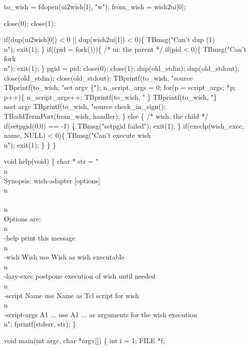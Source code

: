   to_wish = fdopen(ui2wish[1], "w");
  from_wish = wish2ui[0];

  close(0); close(1);

  if(dup(ui2wish[0]) < 0 || dup(wish2ui[1]) < 0)\{
    TBmsg("Can't dup (1)\\n"); exit(1);
  \}
  if((pid = fork()))\{
    /* ui: the parent */
    if(pid < 0)\{
      TBmsg("Can't fork\\n"); exit(1);
    \}
    pgid = pid;
    close(0); close(1);
    dup(old_stdin);
    dup(old_stdout);
    close(old_stdin);
    close(old_stdout);
    TBprintf(to_wish, "source %
    TBprintf(to_wish, "set argv \{");
    n_script_args = 0;
    for(p = script_args; *p; p++)\{
      n_script_args++;   
      TBprintf(to_wish, "%
    \}  
    TBprintf(to_wish, "\}\\nset argc %
    TBprintf(to_wish, "source %
    check_in_sign();
    TBaddTermPort(from_wish, handler);
  \} else \{
    /* wish: the child */
    if(setpgid(0,0) == -1) \{
      TBmsg("setpgid failed");
      exit(1);
    \}
    if(execlp(wish_exec, name, NULL) < 0)\{
      TBmsg("Can't execute wish\\n");
      exit(1);
    \}
  \}
\}

void help(void)
\{
  char * str =
"\\n\\
Synopsis: wish-adapter [options]\\n\\
\\n\\
Options are:\\n\\
-help                 print this message\\n\\
-wish Wish            use Wish as wish executable\\n\\
-lazy-exec            postpone execution of wish until needed\\n\\
-script Name          use Name as Tcl script for wish\\n\\
-script-args A1 ...   use A1 ... as arguments for the wish execution\\n";
  fprintf(stderr, str);
\}

void main(int argc, char *argv[])
\{
  int i = 1;
  FILE *f;

